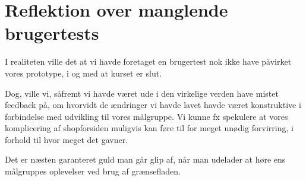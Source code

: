 \section{Reflektion over manglende brugertests}

I realiteten ville det at vi havde foretaget en brugertest nok ikke have påvirket vores prototype, i og med at kurset er slut.

Dog, ville vi, såfremt vi havde været ude i den virkelige verden have mistet feedback på, om hvorvidt de ændringer vi havde lavet havde været konstruktive i forbindelse med udvikling til vores målgruppe. Vi kunne fx spekulere at vores komplicering af shopforsiden muligvis kan føre til for meget unødig forvirring, i forhold til hvor meget det gavner.

Det er næsten garanteret guld man går glip af, når man udelader at høre ens målgruppes oplevelser ved brug af grænsefladen.
